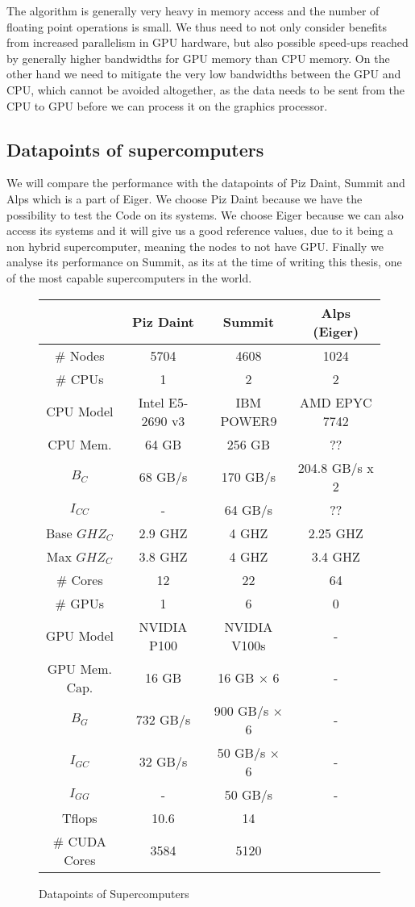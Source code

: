 \documentclass[]{article}
\begin{document}
The algorithm is generally very heavy in memory access and the number of floating point operations is small. We thus need to not only consider benefits from increased parallelism in GPU hardware, but also possible speed-ups reached by generally higher bandwidths for GPU memory than CPU memory. On the other hand we need to mitigate the very low bandwidths between the GPU and CPU, which cannot be avoided altogether, as the data needs to be sent from the CPU to GPU before we can process it on the graphics processor.


\subsection{Datapoints of supercomputers}

We will compare the performance with the datapoints of Piz Daint, Summit and Alps which is a part of Eiger. We choose Piz Daint because we have the possibility to test the Code on its systems. We choose Eiger because we can also access its systems and it will give us a good reference values, due to it being a non hybrid supercomputer, meaning the nodes to not have GPU. Finally we analyse its performance on Summit, as its at the time of writing this thesis, one of the most capable supercomputers in the world.

\small
\begin{figure}[H]
	\begin{center}
		\begin{tabular}{|@{} c | c | c | c | }
			& Piz Daint \cite{piz_daint} & Summit\cite{summit} & Alps (Eiger) \\ 
			\hline
			\# Nodes & 5704 & 4608 & 1024\\
			\# CPUs & 1 & 2 & 2\\
			CPU Model & Intel E5-2690 v3 \cite{E5-2690} & IBM POWER9 & AMD EPYC 7742\cite{AMDEPYC} \\
			CPU Mem. & 64 GB & 256 GB & ?? \\   
			$B_C$  & 68 GB/s & 170 GB/s & 204.8 GB/s x 2	\\
			$I_{CC}$ & - & 64 GB/s & ?? \\
			Base $GHZ_C$ & 2.9 GHZ & 4 GHZ & 2.25 GHZ\\
			Max $GHZ_C$ & 3.8 GHZ & 4 GHZ & 3.4 GHZ\\
			\# Cores & 12 & 22 & 64 \\
			\# GPUs & 1 & 6 & 0 \\
			GPU Model & NVIDIA P100 \cite{TESLAP100} & NVIDIA V100s \cite{NVIDIAV100} & - \\
			GPU Mem. Cap. & 16 GB & 16 GB $\times$ 6 & -\\
			$B_G$ & 732 GB/s & 900 GB/s $\times$ 6 & -\\
			$I_{GC}$ & 32 GB/s & 50 GB/s $\times$ 6 & -\\
			$I_{GG}$ & - & 50 GB/s & -\\
			Tflops & 10.6 & 14 &\\
			\# CUDA Cores & 3584 & 5120 & \\
		\end{tabular}
	\end{center}
	\caption{Datapoints of Supercomputers}
	\label{fig:datapoints}
\end{figure}
\end{document}
